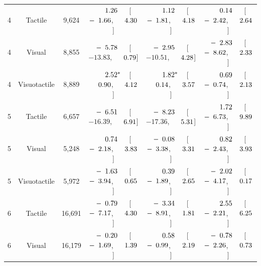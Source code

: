 \begin{table}[htbp]
{\begin{tabular}{lccccc}
\midrule
4 & Tactile & 9,624 & $\hphantom{-}\hphantom{0}1.26^{\hphantom{***}}$ [$-\hphantom{0}1.66$, $\hphantom{-}\hphantom{0}4.30$] & $\hphantom{-}\hphantom{0}1.12^{\hphantom{***}}$ [$-\hphantom{0}1.81$, $\hphantom{-}\hphantom{0}4.18$] & $\hphantom{-}\hphantom{0}0.14^{\hphantom{***}}$ [$-\hphantom{0}2.42$, $\hphantom{-}\hphantom{0}2.64$] \\
4 & Visual & 8,855 & $-\hphantom{0}5.78^{\hphantom{***}}$ [$-13.83$, $\hphantom{-}\hphantom{0}0.79$] & $-\hphantom{0}2.95^{\hphantom{***}}$ [$-10.51$, $\hphantom{-}\hphantom{0}4.28$] & $-\hphantom{0}2.83^{\hphantom{***}}$ [$-\hphantom{0}8.62$, $\hphantom{-}\hphantom{0}2.33$] \\
4 & Visuotactile & 8,889 & $\hphantom{-}\hphantom{0}2.52^{*\hphantom{**}}$ [$\hphantom{-}\hphantom{0}0.90$, $\hphantom{-}\hphantom{0}4.12$] & $\hphantom{-}\hphantom{0}1.82^{*\hphantom{**}}$ [$\hphantom{-}\hphantom{0}0.14$, $\hphantom{-}\hphantom{0}3.57$] & $\hphantom{-}\hphantom{0}0.69^{\hphantom{***}}$ [$-\hphantom{0}0.74$, $\hphantom{-}\hphantom{0}2.13$] \\
\midrule
5 & Tactile & 6,657 & $-\hphantom{0}6.51^{\hphantom{***}}$ [$-16.39$, $\hphantom{-}\hphantom{0}6.91$] & $-\hphantom{0}8.23^{\hphantom{***}}$ [$-17.36$, $\hphantom{-}\hphantom{0}5.31$] & $\hphantom{-}\hphantom{0}1.72^{\hphantom{***}}$ [$-\hphantom{0}6.73$, $\hphantom{-}\hphantom{0}9.89$] \\
5 & Visual & 5,248 & $\hphantom{-}\hphantom{0}0.74^{\hphantom{***}}$ [$-\hphantom{0}2.18$, $\hphantom{-}\hphantom{0}3.83$] & $-\hphantom{0}0.08^{\hphantom{***}}$ [$-\hphantom{0}3.38$, $\hphantom{-}\hphantom{0}3.31$] & $\hphantom{-}\hphantom{0}0.82^{\hphantom{***}}$ [$-\hphantom{0}2.43$, $\hphantom{-}\hphantom{0}3.93$] \\
5 & Visuotactile & 5,972 & $-\hphantom{0}1.63^{\hphantom{***}}$ [$-\hphantom{0}3.94$, $\hphantom{-}\hphantom{0}0.65$] & $\hphantom{-}\hphantom{0}0.39^{\hphantom{***}}$ [$-\hphantom{0}1.89$, $\hphantom{-}\hphantom{0}2.65$] & $-\hphantom{0}2.02^{\hphantom{***}}$ [$-\hphantom{0}4.17$, $\hphantom{-}\hphantom{0}0.17$] \\
\midrule
6 & Tactile & 16,691 & $-\hphantom{0}0.79^{\hphantom{***}}$ [$-\hphantom{0}7.17$, $\hphantom{-}\hphantom{0}4.30$] & $-\hphantom{0}3.34^{\hphantom{***}}$ [$-\hphantom{0}8.91$, $\hphantom{-}\hphantom{0}1.81$] & $\hphantom{-}\hphantom{0}2.55^{\hphantom{***}}$ [$-\hphantom{0}2.21$, $\hphantom{-}\hphantom{0}6.25$] \\
6 & Visual & 16,179 & $-\hphantom{0}0.20^{\hphantom{***}}$ [$-\hphantom{0}1.69$, $\hphantom{-}\hphantom{0}1.39$] & $\hphantom{-}\hphantom{0}0.58^{\hphantom{***}}$ [$-\hphantom{0}0.99$, $\hphantom{-}\hphantom{0}2.19$] & $-\hphantom{0}0.78^{\hphantom{***}}$ [$-\hphantom{0}2.26$, $\hphantom{-}\hphantom{0}0.73$] \\

\end{tabular}}
\end{table}
